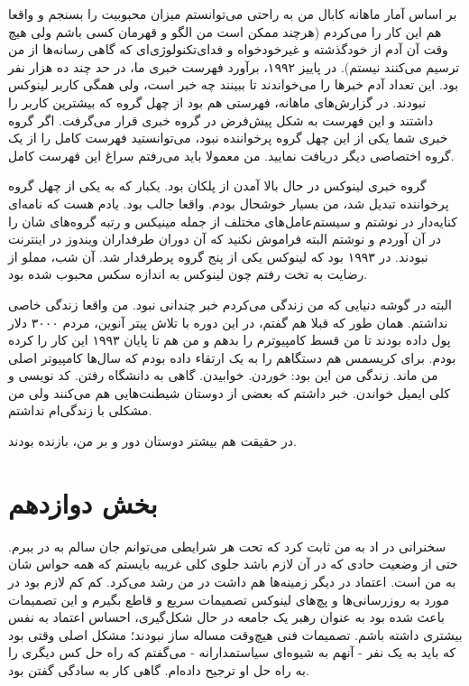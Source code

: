 بر اساس آمار ماهانه کابال من به راحتی می‌توانستم میزان محبوبیت
 را بسنجم و واقعا هم این کار را می‌کردم (هرچند ممکن
است من الگو و قهرمان کسی باشم ولی هیچ وقت آن آدم از خودگذشته و
غیرخودخواه و فدای‌تکنولوژی‌ای که گاهی رسانه‌ها از من ترسیم می‌کنند
نیستم). در پاییز ۱۹۹۲، برآورد فهرست خبری ما، در حد چند ده هزار نفر
بود. این تعداد آدم خبرها را می‌خواندند تا ببینند چه خبر است، ولی همگی
کاربر لینوکس نبودند. در گزارش‌های ماهانه، فهرستی هم بود از چهل گروه که
بیشترین کاربر را داشتند و این فهرست به شکل پیش‌فرض در گروه خبری قرار
می‌گرفت. اگر گروه خبری شما یکی از این چهل گروه پرخواننده نبود،
می‌توانستید فهرست کامل را از یک گروه اختصاصی دیگر دریافت نمایید. من
معمولا باید می‌رفتم سراغ این فهرست کامل.

گروه خبری لینوکس در حال بالا آمدن از پلکان بود. یکبار که به یکی از چهل
گروه پرخواننده تبدیل شد، من بسیار خوشحال بودم. واقعا جالب بود. یادم
هست که نامه‌ای کنایه‌دار در  نوشتم و سیستم‌عامل‌های
مختلف از جمله مینیکس و رتبه گروه‌های شان را در آن آوردم و نوشتم
 البته فراموش نکنید که
آن دوران طرفداران ویندوز در اینترنت نبودند. در ۱۹۹۳ بود که لینوکس یکی
از پنج گروه پرطرفدار شد. آن شب، مملو از رضایت به تخت رفتم چون لینوکس
به اندازه سکس محبوب شده بود.

البته در گوشه دنیایی که من زندگی می‌کردم خبر چندانی نبود. من واقعا
زندگی خاصی نداشتم. همان طور که قبلا هم گفتم، در این دوره با تلاش پیتر
آنوین، مردم ۳۰۰۰ دلار پول داده بودند تا من قسط کامپیوترم را بدهم و من
هم تا پایان ۱۹۹۳ این کار را کرده بودم. برای کریسمس هم دستگاهم را به یک
 ارتقاء داده بودم که سال‌ها کامپیوتر اصلی من ماند. زندگی
من این بود: خوردن. خوابیدن. گاهی به دانشگاه رفتن. کد نویسی و کلی ایمیل
خواندن. خبر داشتم که بعضی از دوستان شیطنت‌هایی هم می‌کنند ولی من مشکلی
با زندگی‌ام نداشتم.

در حقیقت هم بیشتر دوستان دور و بر من، بازنده بودند.

\section{بخش دوازدهم}
سخنرانی در اد به من ثابت کرد که تحت هر شرایطی می‌توانم جان سالم به در
ببرم. حتی از وضعیت حادی که در آن لازم باشد جلوی کلی غریبه بایستم که
همه حواس شان به من است. اعتماد در دیگر زمینه‌ها هم داشت در من رشد
می‌کرد. کم کم لازم بود در مورد به روزرسانی‌ها و پچ‌های لینوکس تصمیمات
سریع و قاطع بگیرم و این تصمیمات باعث شده بود به عنوان رهبر یک جامعه در
حال شکل‌گیری، احساس اعتماد به نفس بیشتری داشته باشم. تصمیمات فنی هیچ‌وقت
مساله ساز نبودند؛ مشکل اصلی وقتی بود که باید به یک نفر - آنهم به
شیوه‌ای سیاستمدارانه - می‌گفتم که راه حل کس دیگری‌ را به راه حل او ترجیح
داده‌ام. گاهی کار به سادگی گفتن  بود.

